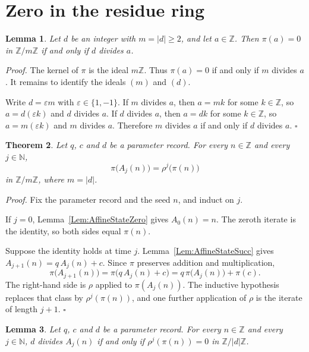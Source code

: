 \documentclass[11pt,letterpaper]{article}
\newcommand{\N}{\mathbb{N}}
\newcommand{\Z}{\mathbb{Z}}
\newtheorem{theorem}{Theorem}
\newtheorem{lemma}[theorem]{Lemma}
\newenvironment{proof}{\noindent\textit{Proof.}}{\hfill\(\square\)}
\begin{document}
\section{Zero in the residue ring}

\begin{lemma}\label{Lem:CastZeroIffDvd}
Let \(d\) be an integer with \(m=|d|\ge 2\), and let \(a\in\Z\). Then
\(\pi(a)=0\) in \(\Z/m\Z\) if and only if \(d\) divides \(a\).
\end{lemma}

\begin{proof}
The kernel of \(\pi\) is the ideal \(m\Z\). Thus \(\pi(a)=0\) if and only if
\(m\) divides \(a\). It remains to identify the ideals \((m)\) and \((d)\).

Write \(d=\varepsilon m\) with \(\varepsilon\in\{1,-1\}\). If \(m\) divides \(a\),
then \(a=mk\) for some \(k\in\Z\), so \(a=d(\varepsilon k)\) and \(d\) divides
\(a\). If \(d\) divides \(a\), then \(a=dk\) for some \(k\in\Z\), so
\(a=m(\varepsilon k)\) and \(m\) divides \(a\). Therefore \(m\) divides \(a\) if
and only if \(d\) divides \(a\).
\end{proof}

\begin{theorem}\label{Thm:AffineCast}
Let \(q\), \(c\) and \(d\) be a parameter record. For every \(n\in\Z\) and every
\(j\in\N\),
\[
\pi\bigl(A_{j}(n)\bigr)=\rho^{j}\bigl(\pi(n)\bigr)
\]
in \(\Z/m\Z\), where \(m=|d|\).
\end{theorem}

\begin{proof}
Fix the parameter record and the seed \(n\), and induct on \(j\).

If \(j=0\), Lemma~\ref{Lem:AffineStateZero} gives \(A_{0}(n)=n\). The zeroth
iterate is the identity, so both sides equal \(\pi(n)\).

Suppose the identity holds at time \(j\). Lemma~\ref{Lem:AffineStateSucc} gives
\(A_{j+1}(n)=q\,A_{j}(n)+c\). Since \(\pi\) preserves addition and
multiplication,
\[
\pi\bigl(A_{j+1}(n)\bigr)
=\pi\bigl(q\,A_{j}(n)+c\bigr)
=q\,\pi\bigl(A_{j}(n)\bigr)+\pi(c).
\]
The right-hand side is \(\rho\) applied to \(\pi(A_{j}(n))\). The inductive
hypothesis replaces that class by \(\rho^{j}(\pi(n))\), and one further
application of \(\rho\) is the iterate of length \(j+1\).
\end{proof}

\begin{lemma}\label{Lem:AffineDvdIffResidueZero}
Let \(q\), \(c\) and \(d\) be a parameter record. For every \(n\in\Z\) and every
\(j\in\N\), \(d\) divides \(A_{j}(n)\) if and only if
\(\rho^{j}(\pi(n))=0\) in \(\Z/|d|\Z\).
\end{lemma}
\end{document}
